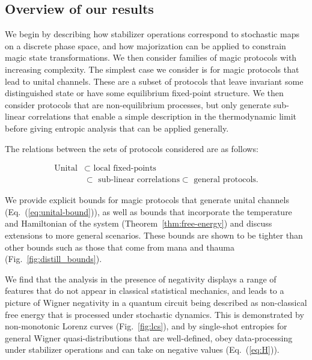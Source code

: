 \documentclass[
onecolumn,
superscriptaddress
]{revtex4-1}
\begin{document}
\subsection*{Overview of our results}
We begin by describing how stabilizer operations correspond to stochastic maps on a discrete phase space, and how majorization can be applied to constrain magic state transformations. We then consider families of magic protocols with increasing complexity. The simplest case we consider is for magic protocols that lead to unital channels. These are a subset of protocols that leave invariant some distinguished state or have some equilibrium fixed-point structure. We then consider protocols that are non-equilibrium processes, but only generate sub-linear correlations that enable a simple description in the thermodynamic limit before giving entropic analysis that can be applied generally.

The relations between the sets of protocols considered are as follows:
\begin{linenomath}\begin{align}
	\mbox{Unital} &\subset \mbox{ local fixed-points} \nonumber\\ 
&\subset \mbox{ sub-linear correlations} \subset \mbox{ general protocols.} \nonumber
\end{align}\end{linenomath}

We provide explicit bounds for magic protocols that generate unital channels (Eq.~(\ref{eq:unital-bound})), as well as bounds that incorporate the temperature and Hamiltonian of the system (Theorem~\ref{thm:free-energy}) and discuss extensions to more general scenarios. These bounds are shown to be tighter than other bounds such as those that come from mana and thauma (Fig.~\ref{fig:distill_bounds}). 

We find that the analysis in the presence of negativity displays a range of features that do not appear in classical statistical mechanics, and leads to a picture of Wigner negativity in a quantum circuit being described as non-classical free energy that is processed under stochastic dynamics. This is demonstrated by non-monotonic Lorenz curves (Fig.~\ref{fig:lcs}), and by single-shot entropies for general Wigner quasi-distributions that are well-defined, obey data-processing under stabilizer operations and can take on negative values (Eq.~(\ref{eq:H})).
\end{document}
